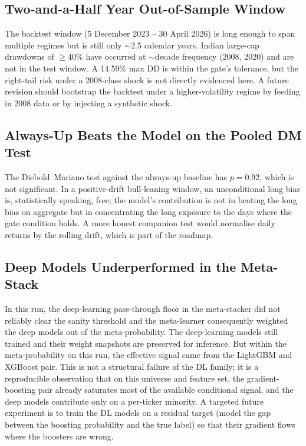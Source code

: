 \subsection{Two-and-a-Half Year Out-of-Sample Window}

The backtest window (5 December 2023 -- 30 April 2026) is long enough to span multiple regimes but is still only $\sim$2.5 calendar years. Indian large-cap drawdowns of $\geq 40\%$ have occurred at $\sim$decade frequency (2008, 2020) and are not in the test window. A 14.59\% max DD is within the gate's tolerance, but the right-tail risk under a 2008-class shock is not directly evidenced here. A future revision should bootstrap the backtest under a higher-volatility regime by feeding in 2008 data or by injecting a synthetic shock.

\subsection{Always-Up Beats the Model on the Pooled DM Test}

The Diebold--Mariano test against the always-up baseline has $p = 0.92$, which is not significant. In a positive-drift bull-leaning window, an unconditional long bias is, statistically speaking, free; the model's contribution is not in beating the long bias on aggregate but in concentrating the long exposure to the days where the gate condition holds. A more honest companion test would normalise daily returns by the rolling drift, which is part of the roadmap.

\subsection{Deep Models Underperformed in the Meta-Stack}

In this run, the deep-learning pass-through floor in the meta-stacker did not reliably clear the sanity threshold and the meta-learner consequently weighted the deep models out of the meta-probability. The deep-learning models still trained and their weight snapshots are preserved for inference. But within the meta-probability on this run, the effective signal came from the LightGBM and XGBoost pair. This is not a structural failure of the DL family; it is a reproducible observation that on this universe and feature set, the gradient-boosting pair already saturates most of the available conditional signal, and the deep models contribute only on a per-ticker minority. A targeted future experiment is to train the DL models on a residual target (model the gap between the boosting probability and the true label) so that their gradient flows where the boosters are wrong.

